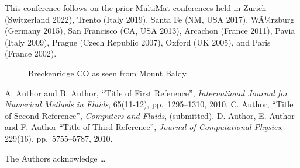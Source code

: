 \documentclass[11pt]{article}
\begin{document}
This conference follows on the prior MultiMat conferences held in Zurich (Switzerland 2022), Trento (Italy 2019), Santa Fe (NM, USA 2017), WÃ¼rzburg (Germany 2015), San Francisco (CA, USA 2013), Arcachon (France 2011), Pavia (Italy 2009), Prague (Czech Republic 2007), Oxford (UK 2005), and Paris (France 2002).

%
%
\begin{figure}[htbp]
\centering
  \caption{Breckenridge CO as seen from Mount Baldy
           \label{fig:Breckenridge}}
\end{figure}

%
%

\begin{thebibliography}{10}
 A. Author and B. Author,
``Title of First Reference'',
\textit{International Journal for Numerical Methods in Fluids}, 65(11-12), pp.~1295--1310, 2010.
 C. Author,
``Title of Second Reference'',
\textit{Computers and Fluids}, (submitted).
 D. Author, E. Author and F. Author
``Title of Third Reference'',
\textit{Journal of Computational Physics}, 229(16), pp.~5755--5787, 2010.
\end{thebibliography}

%
%
The Authors acknowledge \ldots
\end{document}

